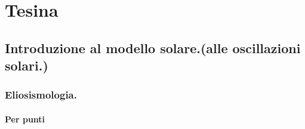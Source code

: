 \documentclass[oneside,12pt,fleqn]{memoir}
\begin{document}
\printbibliography[heading=subbibintoc]


\part{Tesina}



\chapter{Introduzione al modello solare.(alle oscillazioni solari.)}
\PartialToc


\section{Eliosismologia.}

\subsection{Per punti}
\end{document}
